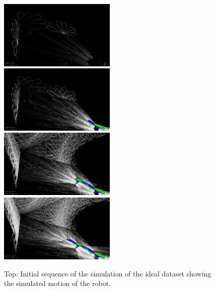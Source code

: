 \begin{figure}
	\centering
	\includegraphics[width=0.495\textwidth]{images/sim_frame_00.png}\hfill
	\includegraphics[width=0.495\textwidth]{images/sim_frame_02.png}\\
	\includegraphics[width=0.495\textwidth]{images/sim_frame_06.png}\hfill
	\includegraphics[width=0.495\textwidth]{images/sim_frame_08.png}\\
	\caption{Top: Initial sequence of the simulation of the ideal dataset showing the simulated motion of the robot.}
	\label{fig:robotRender}
\end{figure}
